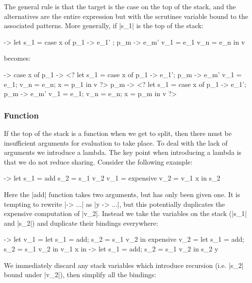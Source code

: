 \documentclass[draft]{sigplanconf}
\begin{document}
The general rule is that the target is the case on the top of the stack, and the alternatives are the entire expression but with the scrutinee variable bound to the associated patterns. More generally, if |s_1| is the top of the stack:

\begin{code}
\free ->  let  s_1  = case x of p_1 -> e_1' ; p_m -> e_m'
               v_1  = e_1
               v_n  = e_n
          in   v
\end{code}

\noindent becomes:

\begin{code}
\free -> case x of
    p_1  -> <? let  s_1 = case x of p_1 -> e_1'; p_m -> e_m'
                    v_1 = e_1; v_n = e_n; x = p_1 in v ?>
    p_m  -> <? let  s_1 = case x of p_1 -> e_1'; p_m -> e_m'
                    v_1 = e_1; v_n = e_n; x = p_m in v ?>
\end{code}

\subsubsection{Function}
\label{sec:eval_split_function}

If the top of the stack is a function when we get to split, then there must be insufficient arguments for evaluation to take place. To deal with the lack of arguments we introduce a lambda. The key point when introducing a lambda is that we do not reduce sharing. Consider the following example:

\begin{code}
\x ->  let  s_1 = add
            s_2 = s_1 v_2
            v_1 = expensive
            v_2 = v_1 x
       in   s_2
\end{code}

Here the |add| function takes two arguments, but has only been given one. It is tempting to rewrite |\x -> ...| as |\x y -> ...|, but this potentially duplicates the expensive computation of |v_2|. Instead we take the variables on the stack (|s_1| and |s_2|) and duplicate their bindings everywhere:

\begin{code}
\x ->  let  v_1 =  let s_1 = add; s_2 = s_1 v_2 in expensive
            v_2 =  let s_1 = add; s_2 = s_1 v_2 in v_1 x
       in   \y ->  let s_1 = add; s_2 = s_1 v_2 in s_2 y
\end{code}

We immediately discard any stack variables which introduce recursion (i.e. |s_2| bound under |v_2|), then simplify all the bindings:
\end{document}
